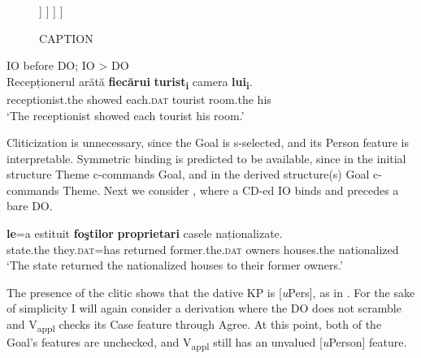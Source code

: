 \documentclass[output=paper,modfonts,nonflat,newtxmath]{langsci/langscibook}
\begin{document}
\begin{figure}%
	\begin{forest}
		[\textit{v}P
			[\textit{v}
			]
			[V\textsubscript{Appl}P
				[V\textsubscript{Appl}\\
					{[}\textit{u}Pers:\_\_{,} \textit{u}Case:\_\_{]}
				]
				[VP
					[DP\textsubscript{Theme}\\{[}Case: \textsc{acc}{]}
					]
					[V'
						[V\\P+V
						]
						[KP\textsubscript{Goal}\\{[}\textit{u}Case: \textsc{dat}{,} \textit{i}Pers{]}
						]
					]
				]
			]
		]
	\end{forest}
	\caption{\label{fig:cornilescu:8} CAPTION \missingcaption}
\end{figure}

\ea%
      \label{ex:cornilescu:25}
      IO before DO; IO > DO \\
      \gll Recepționerul arătă \textbf{fiecărui} \textbf{turist\textsubscript{i}} camera \textbf{lui\textsubscript{i}}.\\
           receptionist.the showed each.\textsc{dat} tourist room.the his\\
      \glt ‘The receptionist showed each tourist his room.’ \citep{CornilescuDinuTigău2017DOC}
      \z

Cliticization is unnecessary, since the Goal is s-selected, and its Person feature is interpretable. Symmetric binding is predicted to be available, since in the initial structure Theme c-commands Goal, and in the derived structure(s) Goal c-commands Theme. Next we consider , where a CD-ed IO binds and precedes a bare DO. 

\ea%
 \label{ex:cornilescu:26}
  \textbf{le}=a {estituit} \textbf{foştilor} \textbf{proprietari} {casele} {naționalizate}.\\
 state.the they.\textsc{dat}=has returned former.the.\textsc{dat} owners houses.the nationalized\\
 \glt ‘The state returned the nationalized houses to their former owners.’
 \z

The presence of the clitic shows that the dative KP is [\textit{u}Pers], as in . For the sake of simplicity I will again consider a derivation where the DO does not scramble and V\textsubscript{appl} checks its Case feature through Agree. At this point, both of the Goal’s features are unchecked, and V\textsubscript{appl} still has an unvalued [\textit{u}Person] feature.
\end{document}
